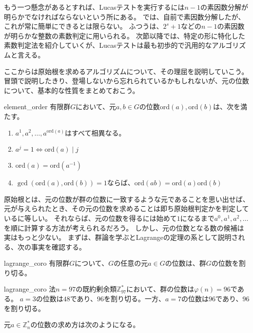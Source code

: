 もう一つ懸念があるとすれば、Lucasテストを実行するには$n-1$の素因数分解が明らかでなければならないという所にある。
では、自前で素因数分解したが、これが常に簡単にできるとは限らない。
ふつうは、$2^s+1$などの$n-1$の素因数が明らかな整数の素数判定に用いられる。
次節以降では、特定の形に特化した素数判定法を紹介していくが、Lucasテストは最も初歩的で汎用的なアルゴリズムと言える。

ここからは原始根を求めるアルゴリズムについて、その理屈を説明していこう。
冒頭で説明したきり、登場しないから忘れられているかもしれないが、元の位数について、基本的な性質をまとめておこう。

\begin{Prop}{}{element_order}
有限群$G$において、元$a,b\in G$の位数$\mbox{ord}(a), \mbox{ord}(b)$は、次を満たす。
\begin{enumerate}
\item $a^1,a^2,\ldots,a^{\mbox{ord}(a)}$はすべて相異なる。
\item $a^j=1 \iff \mbox{ord}(a) \mid j$
\item $\mbox{ord}(a) = \mbox{ord}(a^{-1})$
\item $\gcd(\mbox{ord}(a), \mbox{ord}(b))=1$ならば、$\mbox{ord}(ab)=\mbox{ord}(a)\mbox{ord}(b)$
\end{enumerate}
\end{Prop}

原始根とは、元の位数が群の位数に一致するような元であることを思い出せば、元が与えられたとき、その元の位数を求めることは即ち原始根判定かを判定しているに等しい。
それならば、元の位数を得るには始めて$1$になるまで$a^0, a^1, a^2, \ldots$を順に計算する方法が考えられるだろう。
しかし、元の位数となる数の候補は実はもっと少ない。
まずは、群論を学ぶとLagrangeの定理の系として説明される、次の事実を確認する。

\begin{Prop}{}{lagrange_coro}
有限群$G$について、$G$の任意の元$a\in G$の位数は、群$G$の位数を割り切る。
\end{Prop}

\begin{Exam}{}{lagrange_coro}
法$n=97$の既約剰余類$\mathbb{Z}_{97}^*$において、群の位数は$\varphi(n)=96$である。
$a=3$の位数は$48$であり、$96$を割り切る。一方、$a=7$の位数は$96$であり、$96$を割り切る。
\end{Exam}

元$a \in \mathbb{Z}_n^*$の位数の求め方は次のようになる。


